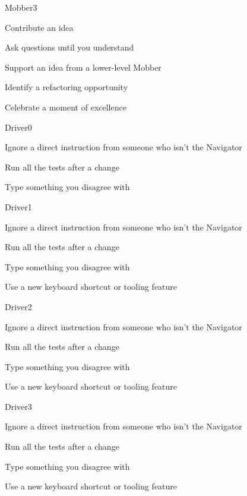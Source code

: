 \documentclass[letterpaper,20pt]{extarticle}
\begin{document}
\begin{role}{Mobber}{3}
  \item Contribute an idea
  \item Ask questions until you understand
  \item Support an idea from a lower-level Mobber
  \item Identify a refactoring opportunity
  \item Celebrate a moment of excellence
\end{role}


\renewcommand{\blurb}{Write code according to the Navigator's directions}

\begin{role}{Driver}{0}
  \item Ignore a direct instruction from someone who isn't the Navigator
  \item Run all the tests after a change
  \item Type something you disagree with
\end{role}

\begin{role}{Driver}{1}
  \item Ignore a direct instruction from someone who isn't the Navigator
  \item Run all the tests after a change
  \item Type something you disagree with
  \item Use a new keyboard shortcut or tooling feature
\end{role}

\begin{role}{Driver}{2}
  \item Ignore a direct instruction from someone who isn't the Navigator
  \item Run all the tests after a change
  \item Type something you disagree with
  \item Use a new keyboard shortcut or tooling feature
\end{role}

\begin{role}{Driver}{3}
  \item Ignore a direct instruction from someone who isn't the Navigator
  \item Run all the tests after a change
  \item Type something you disagree with
  \item Use a new keyboard shortcut or tooling feature
\end{role}
\end{document}
